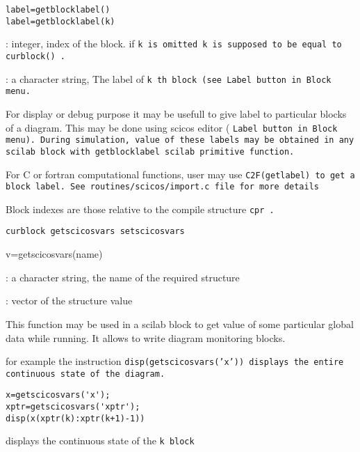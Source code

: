 \begin{verbatim}
label=getblocklabel()
label=getblocklabel(k)
\end{verbatim}
\begin{scitem}
\item[{\verb?k?}]
: integer, index of the block. if %
\tt k %
\rm is omitted %
\tt k%
\rm is
supposed to be equal to   %
\tt curblock()%
\rm . 
\item[{\verb?label?}]
: a character string, The label of %
\tt k%
\rm th block (see  %
\tt Label %
\rm button
in %
\tt Block %
\rm menu.
\end{scitem}%
For display or debug purpose it may be usefull to give label to
particular blocks of a diagram. This may be done using scicos editor 
(%
\tt Label %
\rm button in %
\tt Block %
\rm menu). During simulation, value of
these labels may be obtained in any scilab block with %
\tt getblocklabel %
\rm scilab primitive function. 
\par\noindent
For C or fortran computational functions, user may use
\tt C2F(getlabel) %
\rm to get a block label. See
%
\tt routines/scicos/import.c %
\rm file for more details
\par\noindent

Block indexes are those relative to the compile structure%
\tt cpr%
\rm . 

{\verb?curblock getscicosvars setscicosvars?} \pageref{curblockgetscicosvarssetscicosvars}




%
%


\label{getscicosvars}

v=getscicosvars(name)
\begin{scitem}
\item[{\verb?name?}]
: a character string, the name of the required structure
\item[{\verb?v ?}]
: vector of the structure value
\end{scitem}%
This function may be used in a scilab block to get value of some
particular global data while running. It allows to write diagram
monitoring blocks. 
\par\noindent
for example  the instruction  %
\tt disp(getscicosvars('x')) %
\rm  displays 
the entire continuous state of the diagram.
\begin{verbatim}
x=getscicosvars('x');
xptr=getscicosvars('xptr');
disp(x(xptr(k):xptr(k+1)-1))
\end{verbatim}
displays the continuous state of the %
\tt k %
\rm block

